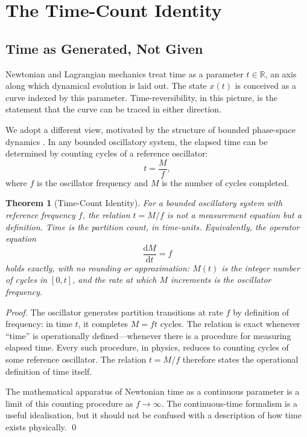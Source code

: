 \documentclass[twocolumn,10pt,a4paper]{article}
\newtheorem{theorem}{Theorem}[section]
\theoremstyle{definition}
\theoremstyle{remark}
\newcommand{\Mcount}{M}
\newcommand{\Real}{\mathbb{R}}
\newcommand{\dM}{\mathrm{d}M}
\newcommand{\dt}{\mathrm{d}t}
\begin{document}
\section{The Time-Count Identity}
\label{sec:time-count}

\subsection{Time as Generated, Not Given}

Newtonian and Lagrangian mechanics treat time as a parameter $t \in \Real$, an axis along which dynamical evolution is laid out. The state $x(t)$ is conceived as a curve indexed by this parameter. Time-reversibility, in this picture, is the statement that the curve can be traced in either direction.

We adopt a different view, motivated by the structure of bounded phase-space dynamics \citep{sachikonye2025temporal}. In any bounded oscillatory system, the elapsed time can be determined by counting cycles of a reference oscillator:
\begin{equation}
    t = \frac{\Mcount}{f},
    \label{eq:tmf}
\end{equation}
where $f$ is the oscillator frequency and $\Mcount$ is the number of cycles completed.

\begin{theorem}[Time-Count Identity]
\label{thm:time-count}
For a bounded oscillatory system with reference frequency $f$, the relation $t = \Mcount/f$ is not a measurement equation but a definition. Time is the partition count, in time-units. Equivalently, the operator equation
\begin{equation}
    \frac{\dM}{\dt} = f
\end{equation}
holds exactly, with no rounding or approximation: $\Mcount(t)$ is the integer number of cycles in $[0, t]$, and the rate at which $\Mcount$ increments \emph{is} the oscillator frequency.
\end{theorem}

\begin{proof}
The oscillator generates partition transitions at rate $f$ by definition of frequency: in time $t$, it completes $\Mcount = ft$ cycles. The relation is exact whenever ``time'' is operationally defined---whenever there is a procedure for measuring elapsed time. Every such procedure, in physics, reduces to counting cycles of some reference oscillator. The relation $t = \Mcount/f$ therefore states the operational definition of time itself.

The mathematical apparatus of Newtonian time as a continuous parameter is a limit of this counting procedure as $f \to \infty$. The continuous-time formalism is a useful idealisation, but it should not be confused with a description of how time exists physically.
\qed
\end{proof}
\end{document}
